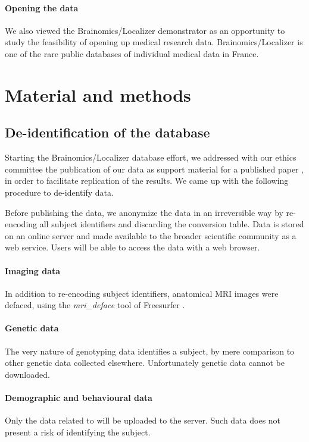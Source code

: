 \documentclass[review]{elsarticle}
\begin{document}
\paragraph{Opening the data} We also viewed the Brainomics/Localizer demonstrator
as an opportunity  to study the feasibility of opening up medical research data.
Brainomics/Localizer is one of the rare public databases of individual medical
data in France.


\section{Material and methods}

\subsection{De-identification of the database}

Starting the Brainomics/Localizer database effort, we addressed with our ethics
committee the publication of our data as support material for a published
paper \cite{Pinel2012}, in order to facilitate replication of the results. We came
up with the following procedure to de-identify data.

Before publishing the data, we anonymize the data in an irreversible way by
re-encoding all subject identifiers and discarding the conversion table. Data
is stored on an online server and made available to the broader scientific
community as a web service. Users will be able to access the data with a web
browser.

\paragraph{Imaging data} In addition to re-encoding subject identifiers,
anatomical MRI images were defaced, using the \textit{mri\_deface} tool of
Freesurfer \cite{Fischl2012}.

\paragraph{Genetic data} The very nature of genotyping data identifies a subject, by mere comparison to other genetic data collected elsewhere. Unfortunately genetic data cannot be downloaded.

\paragraph{Demographic and behavioural data} Only the data related to \cite{Pinel2007}
will be uploaded to the server. Such data does not present a risk of identifying the subject.
\end{document}
